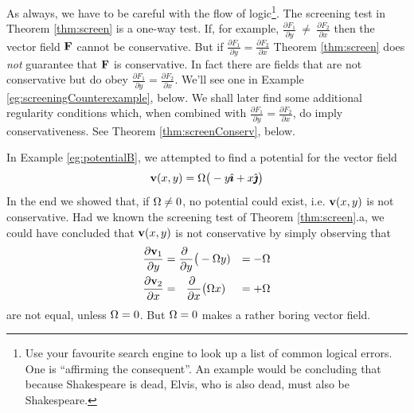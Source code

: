\begin{warning}\label{warn:screening}
As always, we have to be careful with the flow of logic\footnote{
Use your favourite search engine to look up a list of common logical
errors. One is ``affirming the consequent''. An example would be concluding 
that because Shakespeare is dead, Elvis, who is also dead, 
must also be Shakespeare.}.
The screening test in Theorem \ref{thm:screen} is a one-way test.
If, for example, 
$\frac{\partial F_1}{\partial y}~\ne~\frac{\partial F_2}{\partial x}$
then the vector field $\mathbf{F}$ cannot be conservative. But if
$\frac{\partial F_1}{\partial y} =  \frac{\partial F_2}{\partial x}$
Theorem \ref{thm:screen} does \emph{not} guarantee that
$\mathbf{F}$ is conservative. In fact there are fields that are not conservative
but do obey $\frac{\partial F_1}{\partial y}=\frac{\partial F_2}{\partial x}$.
We'll see one in Example \ref{eg:screeningCounterexample}, below.  
We shall later find some additional regularity conditions which, when 
combined with $\frac{\partial F_1}{\partial y}=\frac{\partial F_2}{\partial x}$,
do imply conservativeness. See Theorem \ref{thm:screenConserv}, below.
\end{warning}


\begin{eg}\label{eg:potentialBB}
In Example \ref{eg:potentialB}, we attempted to find a potential 
for the vector field 
\begin{equation*}
\mathbf{v}(x,y) = \Omega\big(-y\hat{\pmb{\imath}} +x\hat{\pmb{\jmath}}\big)
\end{equation*}
In the end we showed that, if $\Omega\ne 0$, no potential could exist, i.e. 
$\mathbf{v}(x,y)$ is not conservative. Had we known
the screening test of Theorem \ref{thm:screen}.a, we could have
concluded that $\mathbf{v}(x,y)$ is not conservative by simply observing that
\begin{alignat*}{3}
\frac{\partial \mathbf{v}_1}{\partial y}&= \frac{\partial \ }{\partial y}\big(-\Omega y) &= -\Omega \\
\frac{\partial \mathbf{v}_2}{\partial x}&= \ \ \frac{\partial \ }{\partial x}\big(\Omega x) &= +\Omega
\end{alignat*}
are not equal, unless $\Omega=0$. But $\Omega=0$ makes a rather boring vector 
field.
\end{eg}


